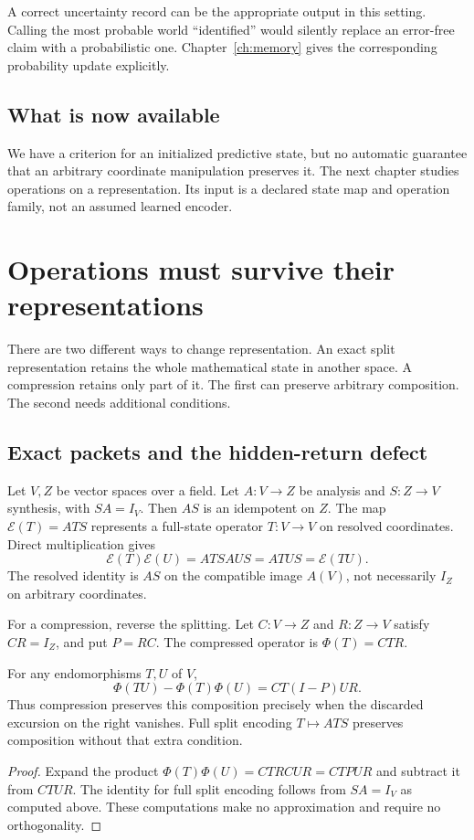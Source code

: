 A correct uncertainty record can be the appropriate output in this setting. Calling the most probable world ``identified'' would silently replace an error-free claim with a probabilistic one. Chapter~\ref{ch:memory} gives the corresponding probability update explicitly.

\section*{What is now available}
We have a criterion for an initialized predictive state, but no automatic guarantee that an arbitrary coordinate manipulation preserves it. The next chapter studies operations on a representation. Its input is a declared state map and operation family, not an assumed learned encoder.

\chapter{Operations must survive their representations}\label{ch:operations}
There are two different ways to change representation. An exact split representation retains the whole mathematical state in another space. A compression retains only part of it. The first can preserve arbitrary composition. The second needs additional conditions.

\section{Exact packets and the hidden-return defect}
Let $V,Z$ be vector spaces over a field. Let $A:V\to Z$ be analysis and $S:Z\to V$ synthesis, with $SA=I_V$. Then $AS$ is an idempotent on $Z$. The map $\mathcal E(T)=ATS$ represents a full-state operator $T:V\to V$ on resolved coordinates. Direct multiplication gives
\[
\mathcal E(T)\mathcal E(U)=ATSAUS=ATUS=\mathcal E(TU).
\]
The resolved identity is $AS$ on the compatible image $A(V)$, not necessarily $I_Z$ on arbitrary coordinates.

For a compression, reverse the splitting. Let $C:V\to Z$ and $R:Z\to V$ satisfy $CR=I_Z$, and put $P=RC$. The compressed operator is $\Phi(T)=CTR$.

\begin{proposition}\label{r:packet}
For any endomorphisms $T,U$ of $V$,
\[
\Phi(TU)-\Phi(T)\Phi(U)=CT(I-P)UR.
\]
Thus compression preserves this composition precisely when the discarded excursion on the right vanishes. Full split encoding $T\mapsto ATS$ preserves composition without that extra condition.
\end{proposition}
\begin{proof}
Expand the product $\Phi(T)\Phi(U)=CTRCUR=CTPUR$ and subtract it from $CTUR$. The identity for full split encoding follows from $SA=I_V$ as computed above. These computations make no approximation and require no orthogonality.
\end{proof}

